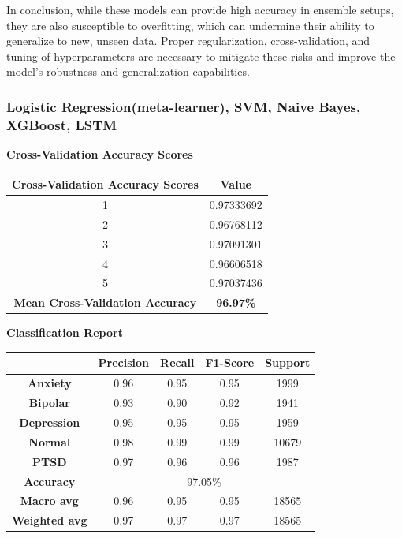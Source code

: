 \vspace{1em}

\noindent
In conclusion, while these models can provide high accuracy in ensemble setups, they are also susceptible to overfitting, which can undermine their ability to generalize to new, unseen data. Proper regularization, cross-validation, and tuning of hyperparameters are necessary to mitigate these risks and improve the model's robustness and generalization capabilities.


\subsubsection{Logistic Regression(meta-learner), SVM, Naive Bayes, XGBoost, LSTM}

\begin{center}
    \textbf{Cross-Validation Accuracy Scores} \\[0.5em]
    \begin{tabular}{|c|c|}
        \hline
        \textbf{Cross-Validation Accuracy Scores} & \textbf{Value} \\ \hline
        1 & 0.97333692 \\ \hline
        2 & 0.96768112 \\ \hline
        3 & 0.97091301 \\ \hline
        4 & 0.96606518 \\ \hline
        5 & 0.97037436 \\ \hline
        \textbf{Mean Cross-Validation Accuracy} & \textbf{96.97\%} \\ \hline
    \end{tabular}
\end{center}

\pagebreak

\begin{center}
    \textbf{Classification Report} \\[0.5em]
    \begin{tabular}{|c|c|c|c|c|}
        \hline
        & \textbf{Precision} & \textbf{Recall} & \textbf{F1-Score} & \textbf{Support} \\ \hline
        \textbf{Anxiety}    & 0.96 & 0.95 & 0.95 & 1999 \\ \hline
        \textbf{Bipolar}    & 0.93 & 0.90 & 0.92 & 1941 \\ \hline
        \textbf{Depression} & 0.95 & 0.95 & 0.95 & 1959 \\ \hline
        \textbf{Normal}     & 0.98 & 0.99 & 0.99 & 10679 \\ \hline
        \textbf{PTSD}       & 0.97 & 0.96 & 0.96 & 1987 \\ \hline
        \textbf{Accuracy}   & \multicolumn{4}{c|}{97.05\%} \\ \hline
        \textbf{Macro avg}  & 0.96 & 0.95 & 0.95 & 18565 \\ \hline
        \textbf{Weighted avg} & 0.97 & 0.97 & 0.97 & 18565 \\ \hline
    \end{tabular}
\end{center}

